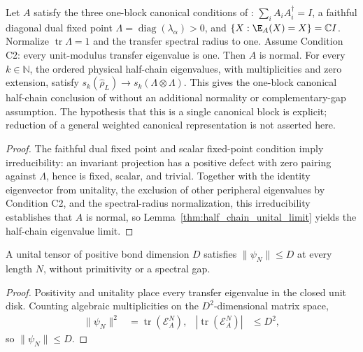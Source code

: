 \begin{theorem}%
    \label{thm:half_chain_source_limit}
    \leanok
    Let $A$ satisfy the three one-block canonical conditions of
    \cite[Theorem~4]{PerezGarcia2007Matrix}: $\sum_i A_iA_i^\dagger=I$,
    a faithful diagonal dual fixed point $\Lambda=\operatorname{diag}
        (\lambda_\alpha)>0$, and
    $\{X:\E_A(X)=X\}=\mathbb C I$.
    Normalize $\operatorname{tr}\Lambda=1$ and the transfer spectral radius
    to one. Assume Condition C2: every unit-modulus transfer eigenvalue is one.
    Then $A$ is normal. For every $k\in\mathbb N$, the ordered physical
    half-chain eigenvalues, with multiplicities and zero extension, satisfy
    $s_k(\widehat\rho_L)\to s_k(\Lambda\otimes\Lambda)$.
    This gives the one-block canonical half-chain conclusion of
    \cite[Theorem~6]{PerezGarcia2007Matrix} without an additional normality
    or complementary-gap assumption. The hypothesis that this is a single
    canonical block is explicit; reduction of a general weighted canonical
    representation is not asserted here.
\end{theorem}

\begin{proof}
    \leanok
    The faithful dual fixed point and scalar fixed-point condition imply
    irreducibility: an invariant projection has a positive defect with
    zero pairing against $\Lambda$, hence is fixed, scalar, and trivial.
    Together with the identity eigenvector from unitality, the exclusion of
    other peripheral eigenvalues by Condition C2, and the spectral-radius
    normalization, this irreducibility establishes that $A$ is normal, so
    Lemma~\ref{thm:half_chain_unital_limit} yields the half-chain eigenvalue
    limit.
\end{proof}


\begin{lemma}
    \label{lem:half_chain_unital_periodic_norm}
    \leanok
    A unital tensor of positive bond dimension $D$ satisfies
    $\|\psi_N\|\leq D$ at every length $N$, without primitivity or
    a spectral gap.
\end{lemma}
\begin{proof}\leanok
    Positivity and unitality place every transfer eigenvalue in the
    closed unit disk. Counting algebraic multiplicities on the
    $D^2$-dimensional matrix space,
    \begin{align}
        \|\psi_N\|^2
         & =\operatorname{tr}\left(\mathcal E_A^N\right),
         & \left|\operatorname{tr}\left(\mathcal E_A^N\right)\right|
         & \leq D^2,
        \label{eq:half_chain_unital_periodic_norm_trace}
    \end{align}
    so $\|\psi_N\|\leq D$.
\end{proof}

